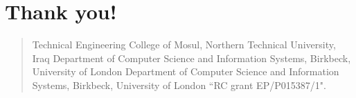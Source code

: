 % 
%  
%

\chapter{Thank you!}

\begin{verse}
%
{Technical Engineering College of Mosul, Northern Technical University, Iraq}
%
{Department of Computer Science and Information Systems, Birkbeck, University of London}
%
   {Department of Computer Science and Information Systems, Birkbeck, University of London}
``RC grant EP/P015387/1".
\end{verse}


